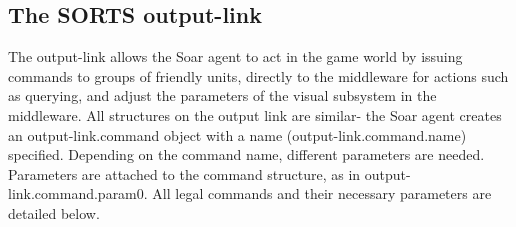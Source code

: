 \subsection{The SORTS output-link}

The output-link allows the Soar agent to act in the game world by issuing commands to groups of friendly units, directly to the middleware for actions such as querying,
and adjust the parameters of the visual subsystem in the middleware. All structures on the output link are similar- the Soar agent creates an output-link.command object with a name (output-link.command.name) specified. Depending on the command name, different parameters are needed. Parameters are attached to the command structure, as in output-link.command.param0. All legal commands and their necessary parameters are detailed below.


